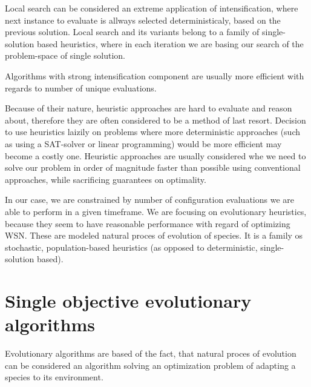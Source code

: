 \documentclass[12pt,oneside]{fithesis2}
\begin{document}
Local search can be considered an extreme application of intensification, where next instance to evaluate is allways selected deterministicaly, based on the previous solution. Local search and its variants belong to a family of single-solution based heuristics, where in each iteration we are basing our search of the problem-space of single solution.

Algorithms with strong intensification component are usually more efficient with regards to number of unique evaluations.


Because of their nature, heuristic approaches are hard to evaluate and reason about, therefore they are often considered to be a method of last resort. Decision to use heuristics laizily on problems where more deterministic approaches (such as using a SAT-solver or linear programming) would be more efficient may become a costly one. Heuristic approaches are usually considered whe we need to solve our problem in order of magnitude faster than possible using conventional approaches, while sacrificing guarantees on optimality.

In our case, we are constrained by number of configuration evaluations we are able to perform in a given timeframe. 
We are focusing on evolutionary heuristics, because they seem to have reasonable performance with regard of optimizing WSN.\cite{stehl2013opt}
These are modeled natural proces of evolution of species. It is a family os stochastic, population-based heuristics (as opposed to deterministic, single-solution based). 

\section{Single objective evolutionary algorithms}

Evolutionary algorithms are based of the fact, that natural proces of evolution can be considered an algorithm solving an optimization problem of adapting a species to its environment. 
\end{document}
